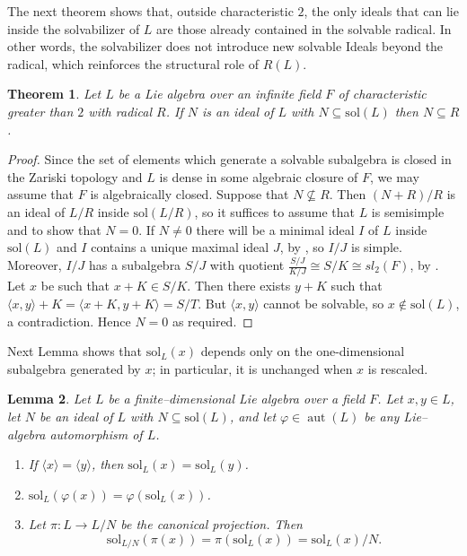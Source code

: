 \documentclass[11pt]{amsart}
\theoremstyle{plain}
\newtheorem{theorem}{Theorem}[section]
\newtheorem{lemma}[theorem]{Lemma}
\def\sol{\mathrm{sol}}
\begin{document}
The next theorem shows that, outside characteristic $2$, the only ideals that can lie inside the solvabilizer of $L$ are those already contained in the solvable radical. In other words, the solvabilizer does not introduce new solvable Ideals beyond the radical, which reinforces the structural role of $R(L)$.

\begin{theorem} 
Let $L$ be a Lie algebra over an infinite field $F$ of characteristic greater than $2$ with radical $R$. If $N$ is an ideal of $L$ with $N\subseteq \sol(L)$ then $N\subseteq R$.
\end{theorem}

\begin{proof} 
 Since the set of elements which generate a solvable subalgebra is closed in the Zariski topology and $L$ is dense in some algebraic closure of $F$, we may assume that $F$ is algebraically closed. Suppose that $N\not\subseteq R$. Then $(N+R)/R$ is an ideal of $L/R$ inside $\sol(L/R)$, so it suffices to assume that $L$ is semisimple and to show that $N=0$. If $N\neq 0$ there will be a minimal ideal $I$ of $L$ inside $\sol(L)$ and $I$ contains a unique maximal ideal $J$, by \cite[Theorem 9.3]{block}, so $I/J$ is simple. Moreover, $I/J$ has a subalgebra $S/J$ with quotient $\frac{S/J}{K/J}\cong S/K\cong sl_2(F)$, by \cite[Lemma 3.2]{gknp}. Let $x$ be such that $x+K\in S/K$. Then there exists $y+K$ such that $\langle x,y \rangle+K=\langle x+K,y+K\rangle =S/T$. But $\langle x,y\rangle$ cannot be solvable, so $x\notin \sol(L)$, a contradiction. Hence $N=0$ as required.
\end{proof}

Next Lemma shows that $\sol_L(x)$ depends only on the one-dimensional subalgebra generated by $x$; in particular, it is unchanged when $x$ is rescaled.


\begin{lemma}\label{Lie-2.11}
Let $L$ be a finite–dimensional Lie algebra over a field $F$.
Let $x,y\in L$, let $N$ be an ideal of $L$ with $N\subseteq \sol(L)$, and let $\varphi\in\operatorname{aut}(L)$ be any Lie–algebra automorphism of $L$.
\begin{enumerate}
\item If $\langle x\rangle=\langle y\rangle$, then $\sol_L(x) = \sol_L(y)$.

\item $\sol_L(\varphi(x)) = \varphi(\sol_L(x))$.

\item Let $\pi : L \longrightarrow L/N$ be the canonical projection. Then \[\sol_{L/N}(\pi(x)) = \pi(\sol_L(x)) = \sol_L(x)/N.\]
\end{enumerate}
\end{lemma}
\end{document}
